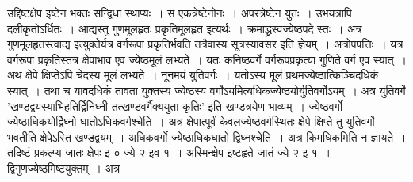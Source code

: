 \documentclass[11pt, openany]{book}
\begin{document}
\begin{sloppypar}
उद्दिष्टक्षेप इष्टेन भक्तः सन्द्विधा स्थाप्यः~। स एकत्रेष्टेनोनः~। अपरत्रेष्टेन युतः~। उभयत्रापि दलीकृतोऽर्धितः~। आद्यस्तु गुणमूलहृतः प्रकृतिमूलहृत इत्यर्थः~। क्रमाद्ध्रस्वज्येष्ठपदे स्तः~। अत्र गुणमूलहृतस्त्वाद्य इत्युक्तेर्यत्र वर्गरूपा प्रकृतिर्भवति तत्रैवास्य सूत्रस्यावसर इति ज्ञेयम्~। अत्रोपपत्तिः~। यत्र वर्गरूपा प्रकृतिस्तत्र क्षेपाभाव एव ज्येष्ठमूलं लभ्यते~। यतः कनिष्ठवर्गे वर्गरूपप्रकृत्या गुणिते वर्ग एव स्यात्~। अथ क्षेपे क्षिप्तेऽपि चेदस्य मूलं लभ्यते~। नूनमयं युतिवर्गः~। यतोऽस्य मूलं प्रथमज्येष्ठात्किञ्चिदधिकं स्यात्~। तथा च यावदधिकं तावता युक्तस्य ज्येष्ठस्य वर्गोऽयमित्यधिकज्येष्ठयोर्युतिवर्गोऽयम्~। अत्र युतिवर्गे 'खण्डद्वयस्याभिहतिर्द्विनिघ्नी तत्खण्डवर्गैक्ययुता कृतिः' इति खण्डत्रयेण भाव्यम्~। ज्येष्ठवर्गो ज्येष्ठाधिकयोर्द्विघ्नो घातोऽधिकवर्गश्चेति~। अत्र क्षेपात्पूर्वं केवलज्येष्ठवर्गस्थितः क्षेपे क्षिप्ते तु युतिवर्गो भवतीति क्षेपेऽस्ति खण्डद्वयम्~। अधिकवर्गो ज्येष्ठाधिकघातो द्विघ्नश्चेति~। अत्र किमधिकमिति न ज्ञायते~। तदिष्टं प्रकल्प्य जातः क्षेपः इ ० ज्ये २ इव १~। अस्मिन्क्षेप इष्टहृते जातं ज्ये २ इ १~। द्विगुणज्येष्ठमिष्टयुक्तम्~। अत्र
\end{sloppypar}

\newpage
\end{document}
